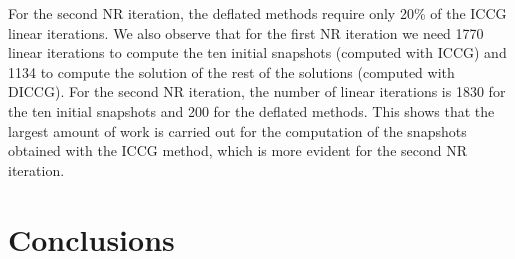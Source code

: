 \documentclass[review]{elsarticle}
\begin{document}
For the second NR iteration, the deflated methods require only 20\% of the ICCG linear iterations. 
We also observe that for the first NR iteration we need 1770 linear iterations to compute the ten initial snapshots (computed with ICCG) and 1134 to compute the solution of the rest of the solutions (computed with DICCG). For the second NR iteration, the number of linear iterations is 1830 for the ten initial snapshots and 200 for the deflated methods. This shows that the largest amount of work is carried out for the computation of the snapshots obtained with the ICCG method, which is more evident for the second NR iteration.


\section*{Conclusions}
\end{document}
